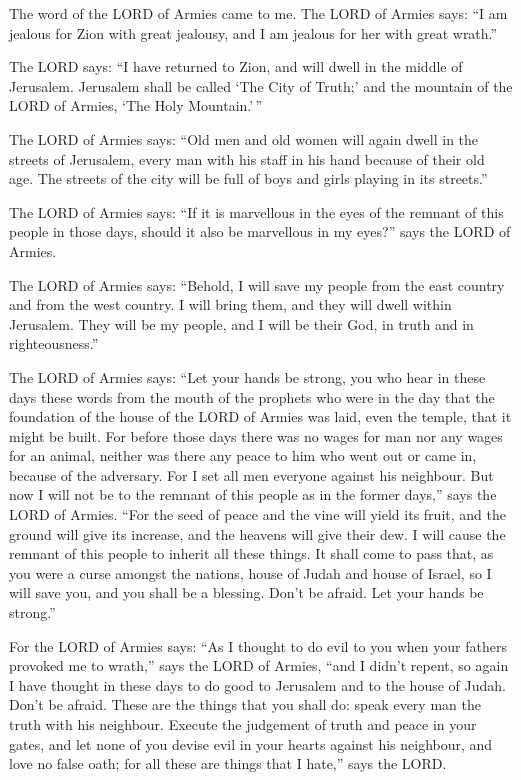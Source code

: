  The word of the LORD of Armies came to me.  The
LORD of Armies says: ``I am jealous for Zion with great jealousy, and I
am jealous for her with great wrath.''

 The LORD says: ``I have returned to Zion, and will dwell in
the middle of Jerusalem. Jerusalem shall be called `The City of Truth;'
and the mountain of the LORD of Armies, `The Holy Mountain.'\,''

 The LORD of Armies says: ``Old men and old women will again
dwell in the streets of Jerusalem, every man with his staff in his hand
because of their old age.  The streets of the city will be
full of boys and girls playing in its streets.''

 The LORD of Armies says: ``If it is marvellous in the eyes
of the remnant of this people in those days, should it also be
marvellous in my eyes?'' says the LORD of Armies.

 The LORD of Armies says: ``Behold, I will save my people
from the east country and from the west country.  I will
bring them, and they will dwell within Jerusalem. They will be my
people, and I will be their God, in truth and in righteousness.''

 The LORD of Armies says: ``Let your hands be strong, you
who hear in these days these words from the mouth of the prophets who
were in the day that the foundation of the house of the LORD of Armies
was laid, even the temple, that it might be built.  For
before those days there was no wages for man nor any wages for an
animal, neither was there any peace to him who went out or came in,
because of the adversary. For I set all men everyone against his
neighbour.  But now I will not be to the remnant of this
people as in the former days,'' says the LORD of Armies. 
``For the seed of peace and the vine will yield its fruit, and the
ground will give its increase, and the heavens will give their dew. I
will cause the remnant of this people to inherit all these things.
 It shall come to pass that, as you were a curse amongst
the nations, house of Judah and house of Israel, so I will save you, and
you shall be a blessing. Don't be afraid. Let your hands be strong.''

 For the LORD of Armies says: ``As I thought to do evil to
you when your fathers provoked me to wrath,'' says the LORD of Armies,
``and I didn't repent,  so again I have thought in these
days to do good to Jerusalem and to the house of Judah. Don't be afraid.
 These are the things that you shall do: speak every man
the truth with his neighbour. Execute the judgement of truth and peace
in your gates,  and let none of you devise evil in your
hearts against his neighbour, and love no false oath; for all these are
things that I hate,'' says the LORD.


